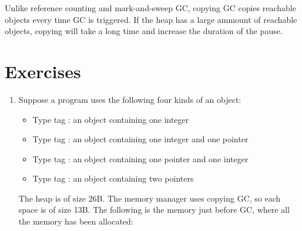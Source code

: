 Unlike reference counting and mark-and-sweep GC, copying GC copies reachable
objects every time GC is triggered. If the heap has a large ammount of reachable
objects, copying will take a long time and increase the duration of the pause.

\section{Exercises}

\begin{enumerate}
\item
Suppose a program uses the following four kinds of an object:

  \begin{itemize}
  \item Type tag : an object containing one integer
  \item Type tag : an object containing one integer and one pointer
  \item Type tag : an object containing one pointer and one integer
  \item Type tag : an object containing two pointers
  \end{itemize}

The heap is of size 26B. The memory manager uses copying GC, so each space is of
size 13B. The following is the memory just before GC, where all the memory
has been allocated:


\end{enumerate}
